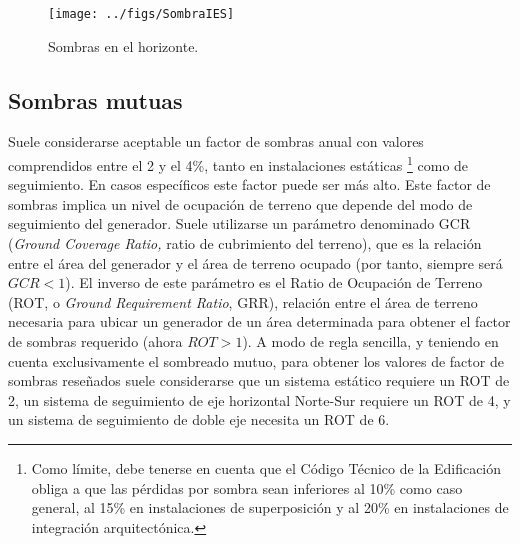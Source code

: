 \begin{figure}
\begin{centering}
\texttt{[image: ../figs/SombraIES]}
\end{centering}

\caption{Sombras en el horizonte.\label{fig:DiagramaSombraLejana}}

\end{figure}



\subsection{Sombras mutuas\label{sub:Sombras-mutuas}}

Suele considerarse aceptable un factor de sombras anual con valores
comprendidos entre el 2 y el 4\%, tanto en instalaciones estáticas%
\footnote{Como límite, debe tenerse en cuenta que el Código Técnico de la Edificación
\cite{CTE2017} obliga a que las pérdidas por sombra sean
inferiores al 10\% como caso general, al 15\% en instalaciones de
superposición y al 20\% en instalaciones de integración arquitectónica.%
} como de seguimiento. En casos específicos este factor puede ser más
alto. Este factor de sombras implica un nivel de ocupación de terreno
que depende del modo de seguimiento del generador. Suele utilizarse
un parámetro denominado GCR (\emph{Ground Coverage Ratio,} ratio de
cubrimiento del terreno), que es la relación entre el área del generador
y el área de terreno ocupado (por tanto, siempre será $GCR<1$). El
inverso de este parámetro es el Ratio de Ocupación de Terreno (ROT, o
\emph{Ground Requirement Ratio}, GRR),
relación entre el área de terreno necesaria para ubicar un generador
de un área determinada para obtener el factor de sombras requerido
(ahora $ROT>1$).
A modo de regla sencilla, y teniendo en cuenta exclusivamente el sombreado
mutuo, para obtener los valores de factor de sombras reseñados suele
considerarse que un sistema estático requiere un ROT de 2, un sistema
de seguimiento de eje horizontal Norte-Sur requiere un ROT de 4, y
un sistema de seguimiento de doble eje necesita un ROT de 6.

